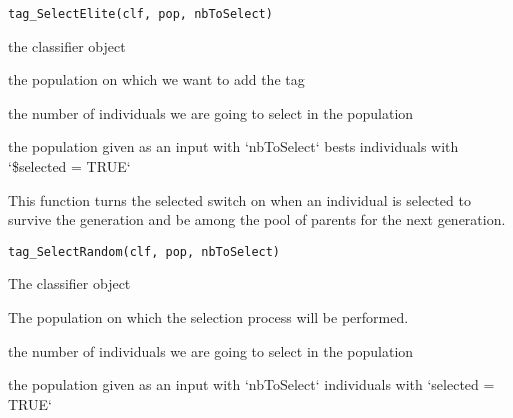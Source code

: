\documentclass[a4paper]{book}
\begin{document}
%
\begin{Usage}
\begin{verbatim}
tag_SelectElite(clf, pop, nbToSelect)
\end{verbatim}
\end{Usage}
%
\begin{Arguments}
\begin{ldescription}
\item[\code{clf:}] the classifier object

\item[\code{pop:}] the population on which we want to add the tag

\item[\code{nbToSelect:}] the number of individuals we are going to select in the population
\end{ldescription}
\end{Arguments}
%
\begin{Value}
the population given as an input with `nbToSelect` bests individuals with `\$selected = TRUE`
\end{Value}
%
\begin{Description}
This function turns the selected switch on when an individual is 
selected to survive the generation and be among the pool of parents for the 
next generation.
\end{Description}
%
\begin{Usage}
\begin{verbatim}
tag_SelectRandom(clf, pop, nbToSelect)
\end{verbatim}
\end{Usage}
%
\begin{Arguments}
\begin{ldescription}
\item[\code{clf:}] The classifier object

\item[\code{pop:}] The population on which the selection process will be performed.

\item[\code{nbToSelect:}] the number of individuals we are going to select in the population
\end{ldescription}
\end{Arguments}
%
\begin{Value}
the population given as an input with `nbToSelect` individuals with `selected = TRUE`
\end{Value}
\end{document}
